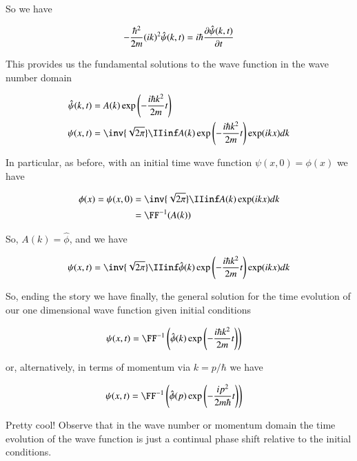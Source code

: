 So we have

\begin{align*}
-\frac{\hbar^2}{2m} (ik)^2 \hat{\psi}(k,t) = i \hbar \PD{t}{\hat{\psi}(k,t)}
\end{align*}

This provides us the fundamental solutions to the wave function in the wave
number domain

\begin{align*}
\hat{\psi}(k,t) &= A(k) \exp\left( -\frac{i \hbar k^2}{ 2 m } t \right) \\
{\psi}(x,t) &= 
\inv{\sqrt{2\pi}} \IIinf A(k) \exp\left( -\frac{i \hbar k^2}{ 2 m } t \right) 
\exp( i k x ) dk \\
\end{align*}

In particular, as before, with an initial time wave function $\psi(x,0) = \phi(x)$ we have

\begin{align*}
\phi(x) = {\psi}(x,0)
&= \inv{\sqrt{2\pi}} \IIinf A(k) \exp( i k x ) dk \\
&= \FF^{-1}(A(k))
\end{align*}

So, $A(k) = \hat{\phi}$, and we have

\begin{align*}
{\psi}(x,t) &= 
\inv{\sqrt{2\pi}} \IIinf \hat{\phi}(k) \exp\left( -\frac{i \hbar k^2}{ 2 m } t \right) \exp( i k x ) dk \\
\end{align*}

So, ending the story we have finally, the general solution for the time evolution of our one dimensional wave function given
initial conditions

\begin{align}
{\psi}(x,t) &= \FF^{-1}\left( \hat{\phi}(k) \exp\left( -\frac{i \hbar k^2}{ 2 m } t \right) \right)
\end{align}

or, alternatively, in terms of momentum via $k = p/\hbar$ we have

\begin{align}
{\psi}(x,t) &= \FF^{-1}\left( \hat{\phi}(p) \exp\left( -\frac{i p^2}{ 2 m \hbar } t \right) \right)
\end{align}

Pretty cool!  Observe that in the wave number or momentum domain the time evolution of the wave function is just a continual phase shift relative to the initial conditions.

